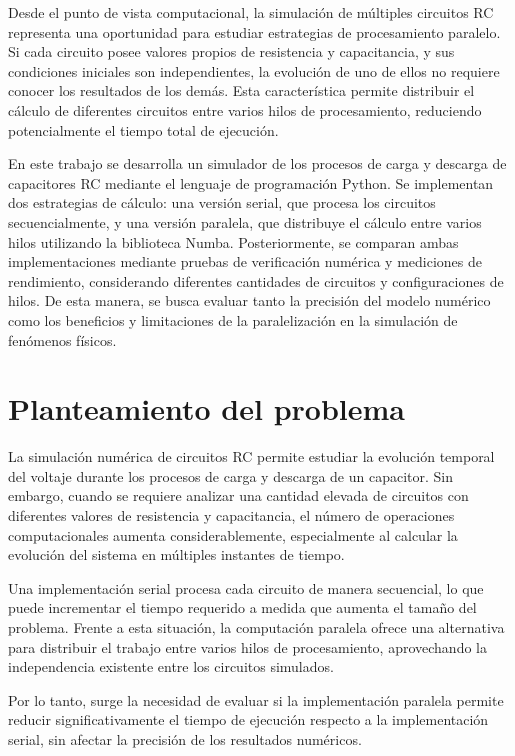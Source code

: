 \documentclass[11pt,a4paper]{article}
\begin{document}
Desde el punto de vista computacional, la simulación de múltiples circuitos RC representa una oportunidad para estudiar estrategias de procesamiento paralelo. Si cada circuito posee valores propios de resistencia y capacitancia, y sus condiciones iniciales son independientes, la evolución de uno de ellos no requiere conocer los resultados de los demás. Esta característica permite distribuir el cálculo de diferentes circuitos entre varios hilos de procesamiento, reduciendo potencialmente el tiempo total de ejecución.

En este trabajo se desarrolla un simulador de los procesos de carga y descarga de capacitores RC mediante el lenguaje de programación Python. Se implementan dos estrategias de cálculo: una versión serial, que procesa los circuitos secuencialmente, y una versión paralela, que distribuye el cálculo entre varios hilos utilizando la biblioteca Numba. Posteriormente, se comparan ambas implementaciones mediante pruebas de verificación numérica y mediciones de rendimiento, considerando diferentes cantidades de circuitos y configuraciones de hilos. De esta manera, se busca evaluar tanto la precisión del modelo numérico como los beneficios y limitaciones de la paralelización en la simulación de fenómenos físicos.

\section{Planteamiento del problema}

La simulación numérica de circuitos RC permite estudiar la evolución temporal del voltaje durante los procesos de carga y descarga de un capacitor. Sin embargo, cuando se requiere analizar una cantidad elevada de circuitos con diferentes valores de resistencia y capacitancia, el número de operaciones computacionales aumenta considerablemente, especialmente al calcular la evolución del sistema en múltiples instantes de tiempo.

Una implementación serial procesa cada circuito de manera secuencial, lo que puede incrementar el tiempo requerido a medida que aumenta el tamaño del problema. Frente a esta situación, la computación paralela ofrece una alternativa para distribuir el trabajo entre varios hilos de procesamiento, aprovechando la independencia existente entre los circuitos simulados.

Por lo tanto, surge la necesidad de evaluar si la implementación paralela permite reducir significativamente el tiempo de ejecución respecto a la implementación serial, sin afectar la precisión de los resultados numéricos.
\end{document}
